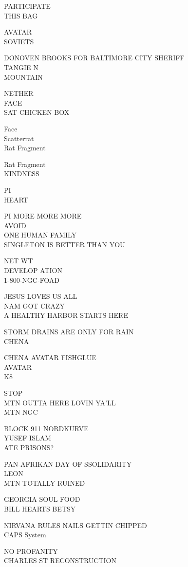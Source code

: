 \documentclass[10pt,letterpaper]{article}
\begin{document}
PARTICIPATE\\
THIS BAG

AVATAR\\
SOVIETS

DONOVEN BROOKS FOR BALTIMORE CITY SHERIFF\\
TANGIE N\\
MOUNTAIN

NETHER\\
FACE\\
SAT CHICKEN BOX

Face\\
Scatterrat\\
Rat Fragment

Rat Fragment\\
KINDNESS

PI\\
HEART

PI MORE MORE MORE\\
AVOID\\
ONE HUMAN FAMILY\\
SINGLETON IS BETTER THAN YOU

NET WT\\
DEVELOP ATION\\
1{-}800{-}NGC{-}FOAD

JESUS LOVES US ALL\\
NAM GOT CRAZY\\
A HEALTHY HARBOR STARTS HERE

STORM DRAINS ARE ONLY FOR RAIN\\
CHENA

CHENA AVATAR FISHGLUE\\
AVATAR\\
K8

STOP\\
MTN OUTTA HERE LOVIN YA'LL\\
MTN NGC

BLOCK 911 NORDKURVE\\
YUSEF ISLAM\\
ATE PRISONS?

PAN{-}AFRIKAN DAY OF SSOLIDARITY\\
LEON\\
MTN TOTALLY RUINED

GEORGIA SOUL FOOD\\
BILL HEARTS BETSY

NIRVANA RULES NAILS GETTIN CHIPPED\\
CAPS System

NO PROFANITY\\
CHARLES ST RECONSTRUCTION
\end{document}
